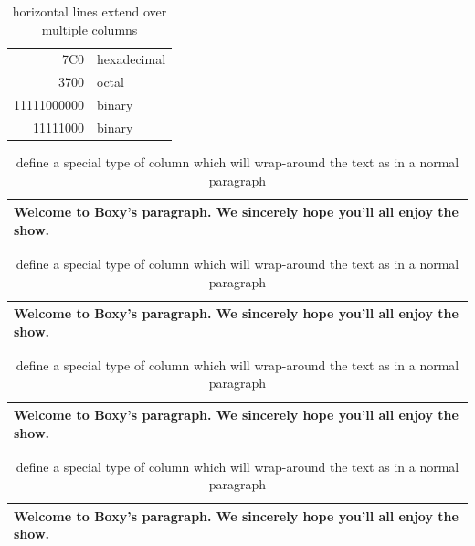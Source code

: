 \begin{table}
    \label{tab:tabular_example3}
    \centering
    \begin{tabular}{|r|l|}
        \hline
        7C0 & hexadecimal \\
        \cline{1-2}
        3700 & octal \\
        \cline{2-2}
        11111000000 & binary \\
        \cline{1-2}
        11111000 & binary \\
        \hline
    \end{tabular}
\caption{horizontal lines extend over multiple columns}
\end{table}

\begin{table}
    \label{tab:tabular_example4}
    \centering
    \begin{tabular}{|p{4.7cm}|}
        \hline Welcome to Boxy's paragraph. We sincerely hope you'll all enjoy the show.\\
        \hline
    \end{tabular}
    \caption{define a special type of column which will wrap-around the text as in a normal paragraph}
\end{table}

\begin{table}
    \label{tab:tabular_example8}
    \centering
    \begin{tabular}{p{4.7cm}}
        \hline
        Welcome to Boxy's paragraph.
        We sincerely hope you'll all enjoy the show.\\
        \hline
    \end{tabular}
    \caption{define a special type of column which will wrap-around the text as in a normal paragraph}
\end{table}

\begin{table}
    \label{tab:tabular_example5}
    \centering
    \begin{tabular}{@{} l @{}}
        \hline Welcome to Boxy's paragraph. We sincerely hope you'll all enjoy the show.\\
        \hline
    \end{tabular}
    \caption{define a special type of column which will wrap-around the text as in a normal paragraph}
\end{table}

\begin{table}
    \label{tab:tabular_example6}
    \centering
    \begin{tabular}{l}
        \hline Welcome to Boxy's paragraph. We sincerely hope you'll all enjoy the show.\\
        \hline
    \end{tabular}
    \caption{define a special type of column which will wrap-around the text as in a normal paragraph}
\end{table}

